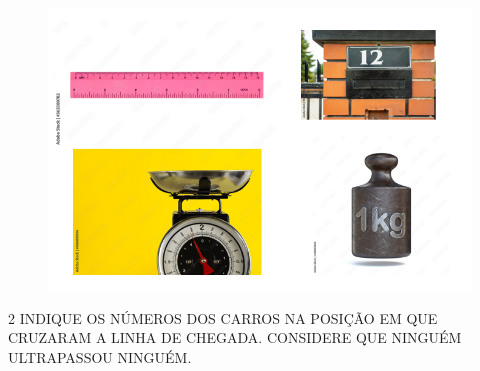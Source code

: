 
\begin{figure}[htpb!]
\includegraphics[width=\textwidth]{media/image2.png}
\end{figure}


\num{2} INDIQUE OS NÚMEROS DOS CARROS NA POSIÇÃO EM QUE CRUZARAM A LINHA DE CHEGADA. CONSIDERE QUE NINGUÉM ULTRAPASSOU NINGUÉM.

